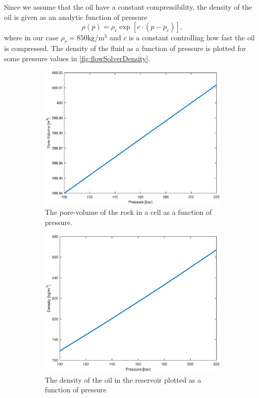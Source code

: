 Since we assume that the oil have a constant compressibility, the density of the oil is given as an analytic function of pressure 
\begin{equation}
    \rho(p) = \rho_r\exp[c\cdot(p-p_r)],
    \label{eq:pressureSolverDensity}
\end{equation}
where in our case $\rho_r = 850\text{kg}/\text{m}^3$ and $c$ is a constant controlling how fast the oil is compressed. The density of the fluid as a function of pressure is plotted for some pressure values in \autoref{fig:flowSolverDensity}.
\begin{figure}[htb]
    \centering
    \begin{subfigure}[t]{0.48\textwidth}
        \includegraphics[width=\textwidth]{figures/flow_solver_pore-volume.eps}
        \caption{The pore-volume of the rock in a cell as a function of pressure.}
        \label{fig:flowSolverDensity}
    \end{subfigure}
    \begin{subfigure}[t]{0.48\textwidth}
        \includegraphics[width=\textwidth]{figures/flow_solver_density.eps}
        \caption{The density of the oil in the reservoir plotted as a function of pressure}
        \label{fig:flowSolverPoreVolume}
    \end{subfigure}
    \caption{}
\end{figure}

